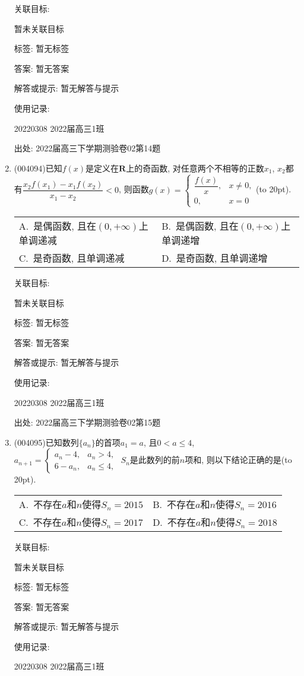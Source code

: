 \documentclass[10pt,a4paper]{article}
\newcommand{\bracket}[1]{(\hbox to #1pt{})}
\newcommand{\twoch}[4]{\par\begin{tabular}{p{.46\textwidth}p{.46\textwidth}}
A.~#1& B.~#2\\
C.~#3& D.~#4
\end{tabular}}
\begin{document}
\begin{enumerate}[1.]
关联目标:

暂未关联目标



标签: 暂无标签

答案: 暂无答案

解答或提示: 暂无解答与提示

使用记录:

20220308	2022届高三1班	


出处: 2022届高三下学期测验卷02第14题
\item { (004094)}已知$f(x)$是定义在$\mathbf{R}$上的奇函数, 对任意两个不相等的正数$x_1$, $x_2$都有$\dfrac{x_2f(x_1)-x_1f(x_2)}{x_1-x_2}<0$, 则函数$g(x)=\begin{cases} \dfrac{f(x)}x, &x\ne 0, \\ 0, & x=0 \end{cases}$\bracket{20}.
\twoch{是偶函数, 且在$(0,+\infty)$上单调递减}{是偶函数, 且在$(0,+\infty)$上单调递增}{是奇函数, 且单调递减}{是奇函数, 且单调递增}


关联目标:

暂未关联目标



标签: 暂无标签

答案: 暂无答案

解答或提示: 暂无解答与提示

使用记录:

20220308	2022届高三1班	


出处: 2022届高三下学期测验卷02第15题
\item { (004095)}已知数列$\{a_n\}$的首项$a_1=a$, 且$0<a\le 4$, $a_{n+1}=\begin{cases}  a_n-4, & a_n>4,  \\ 6-a_n, & a_n\le 4,  \end{cases}$ $S_n$是此数列的前$n$项和, 则以下结论正确的是\bracket{20}.
\twoch{不存在$a$和$n$使得$S_n=2015$}{不存在$a$和$n$使得$S_n=2016$}{不存在$a$和$n$使得$S_n=2017$}{不存在$a$和$n$使得$S_n=2018$}


关联目标:

暂未关联目标



标签: 暂无标签

答案: 暂无答案

解答或提示: 暂无解答与提示

使用记录:

20220308	2022届高三1班	



\end{enumerate}
\end{document}
